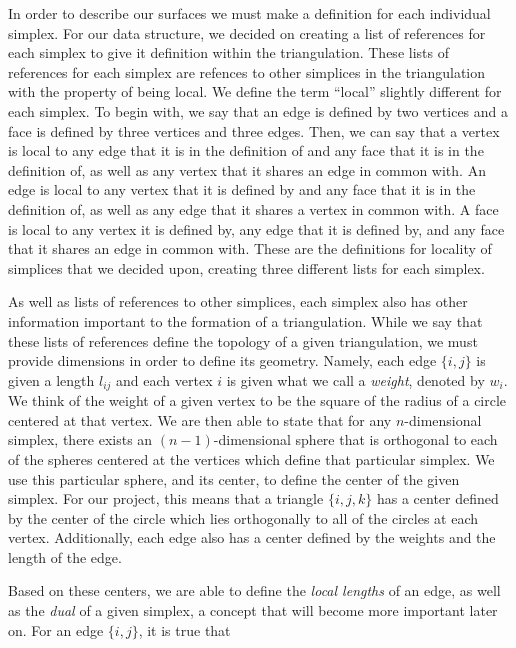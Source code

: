 \documentclass[12pt]{article}
\begin{document}
\noindent In order to describe our surfaces we must make a definition for each individual simplex. For our data structure, we decided on creating a list of references for each simplex to give it definition within the triangulation. These lists of references for each simplex are refences to other simplices in the triangulation with the property of being local. We define the term ``local'' slightly different for each simplex. To begin with, we say that an edge is defined by two vertices and a face is defined by three vertices and three edges. Then, we can say that a vertex is local to any edge that it is in the definition of and any face that it is in the definition of, as well as any vertex that it shares an edge in common with. An edge is local to any vertex that it is defined by and any face that it is in the definition of, as well as any edge that it shares a vertex in common with. A face is local to any vertex it is defined by, any edge that it is defined by, and any face that it shares an edge in common with. These are the definitions for locality of simplices that we decided upon, creating three different lists for each simplex. \newline

\noindent As well as lists of references to other simplices, each simplex also has other information important to the formation of a triangulation. While we say that these lists of references define the topology of a given triangulation, we must provide dimensions in order to define its geometry. Namely, each edge $\{i,j\}$ is given a length $l_{ij}$ and each vertex $i$ is given what we call a \textit{weight}, denoted by $w_i$. We think of the weight of a given vertex to be the square of the radius of a circle centered at that vertex. We are then able to state that for any $\textit{n}$-dimensional simplex, there exists an $(n-1)$-dimensional sphere that is orthogonal to each of the spheres centered at the vertices which define that particular simplex. We use this particular sphere, and its center, to define the center of the given simplex. For our project, this means that a triangle $\{i, j, k\}$ has a center defined by the center of the circle which lies orthogonally to all of the circles at each vertex. Additionally, each edge also has a center defined by the weights and the length of the edge. \newline

\noindent Based on these centers, we are able to define the \textit{local lengths} of an edge, as well as the \textit{dual} of a given simplex, a concept that will become more important later on. For an edge $\{i, j\}$, it is true that 
\end{document}
